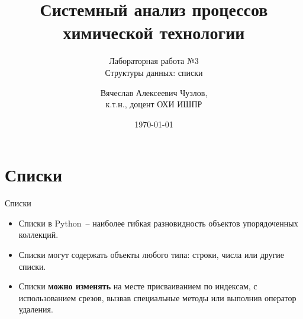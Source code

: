 \documentclass[aspectratio=169, mathserif]{beamer}%
\title{\LARGE{Системный анализ процессов химической технологии}}
\subtitle{Лабораторная работа №3 \\ Структуры данных: списки}
\author[]{Вячеслав Алексеевич Чузлов, \\
к.т.н., доцент ОХИ ИШПР}
\date{\today}
\begin{document}
\newcommand{\pythoninline}[1]{%
	\colorbox{white}{%
		\parbox[b][.6em]{\widthof{\texttt{#1}}}{\texttt{#1}}%
	}%
}


\titleframe%




\section{Списки}
\sectionframe


\begin{frame}[fragile]{Списки}
\scriptsize
\begin{itemize}
\item Списки в Python~-- наиболее гибкая разновидность объектов упорядоченных коллекций. 

\item Списки могут содержать объекты любого типа: строки, числа или другие списки.  

\item Списки \textcolor{extraorange}{\textbf{можно изменять}} на месте присваиванием по индексам, с использованием срезов, вызвав специальные методы или выполнив оператор удаления. 
\end{itemize}


\end{frame}
\end{document}
